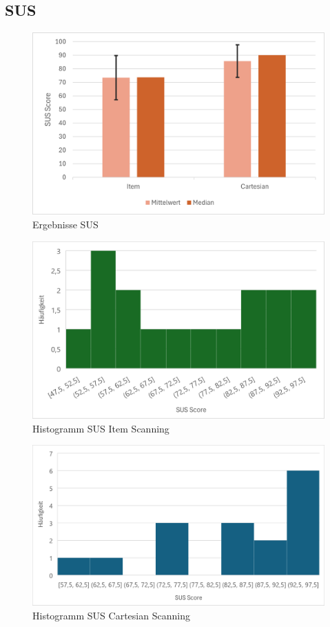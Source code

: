 \subsection{SUS}

\begin{figure}[tbh]
 \centering
\includegraphics{images/Results/SUS-Scores.png}
 \caption{Ergebnisse SUS}
 \label{fig:resultsSUS}
\end{figure}

\begin{figure}[tbh]
 \centering
\includegraphics{images/Results/Histogramm-SUS-Item.png}
 \caption{Histogramm SUS Item Scanning}
 \label{fig:histoSUSItem}
\end{figure}

\begin{figure}[tbh]
 \centering
\includegraphics{images/Results/Histogramm-SUS-Cartesian.png}
 \caption{Histogramm SUS Cartesian Scanning}
 \label{fig:histoSUSCartesian}
\end{figure}

